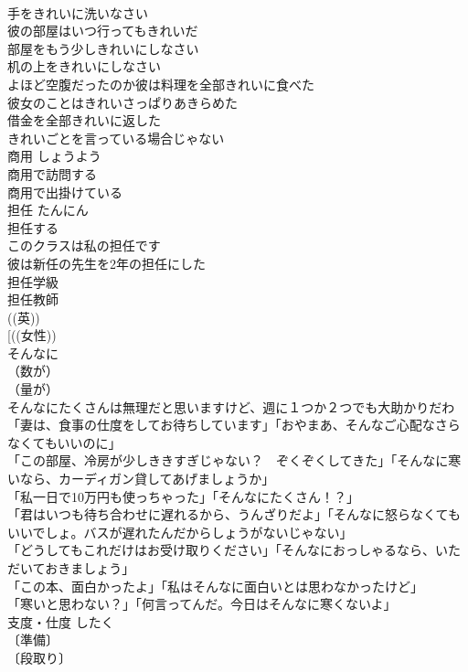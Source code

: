 \documentclass[8pt]{extreport}
\begin{document}
\begin{CJK}{UTF8}{min}
\\	手をきれいに洗いなさい 
\\	彼の部屋はいつ行ってもきれいだ 
\\	部屋をもう少しきれいにしなさい 
\\	机の上をきれいにしなさい 
\\	よほど空腹だったのか彼は料理を全部きれいに食べた 
\\	彼女のことはきれいさっぱりあきらめた 
\\	借金を全部きれいに返した 
\\	きれいごとを言っている場合じゃない 
\\	商用	しょうよう	
\\	商用で訪問する 
\\	商用で出掛けている 
\\	担任	たんにん	
\\	担任する 
\\	このクラスは私の担任です 
\\	彼は新任の先生を2年の担任にした 
\\	担任学級 
\\	担任教師 
\\	((英)) 
\\	[((女性)) 
\\	そんなに		
\\	（数が）
\\	（量が）
\\	そんなにたくさんは無理だと思いますけど、週に１つか２つでも大助かりだわ 
\\	「妻は、食事の仕度をしてお待ちしています」「おやまあ、そんなご心配なさらなくてもいいのに」 
\\	「この部屋、冷房が少しききすぎじゃない？　ぞくぞくしてきた」「そんなに寒いなら、カーディガン貸してあげましょうか」 
\\	「私一日で10万円も使っちゃった」「そんなにたくさん！？」 
\\	「君はいつも待ち合わせに遅れるから、うんざりだよ」「そんなに怒らなくてもいいでしょ。バスが遅れたんだからしょうがないじゃない」 
\\	「どうしてもこれだけはお受け取りください」「そんなにおっしゃるなら、いただいておきましょう」 
\\	「この本、面白かったよ」「私はそんなに面白いとは思わなかったけど」 
\\	「寒いと思わない？」「何言ってんだ。今日はそんなに寒くないよ」 
\\	支度・仕度	したく	
\\	〔準備〕
\\	〔段取り〕

\end{CJK}
\end{document}
